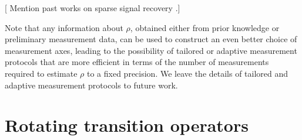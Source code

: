 \documentclass[notitlepage,twocolumn]{revtex4-2}
\newcommand{\1}{\mathds{1}}
\newcommand{\red}[1]{{\color{red} #1}}
\begin{document}
\vspace{3cm}


[\red{Mention past works on sparse signal recovery \cite{rauhut2011sparse, alem2012sparse}.}]

Note that any information about $\rho$, obtained either from prior knowledge or preliminary measurement data, can be used to construct an even better choice of measurement axes, leading to the possibility of tailored or adaptive measurement protocols \cite{pereira2018adaptive} that are more efficient in terms of the number of measurements required to estimate $\rho$ to a fixed precision.
We leave the details of tailored and adaptive measurement protocols to future work.




\onecolumngrid
\appendix

\section{Rotating transition operators}
\label{sec:rotations}
\end{document}
